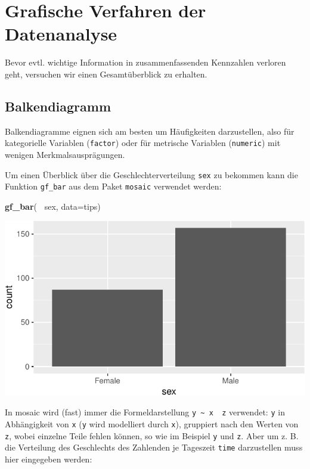 \documentclass[12pt,ngerman,paper=a4,pagesize,DIV=13]{scrreprt}
\newenvironment{Shaded}{\begin{snugshade}}{\end{snugshade}}
\newcommand{\DataTypeTok}[1]{\textcolor[rgb]{0.13,0.29,0.53}{#1}}
\newcommand{\KeywordTok}[1]{\textcolor[rgb]{0.13,0.29,0.53}{\textbf{#1}}}
\newcommand{\NormalTok}[1]{#1}
\newcommand{\OperatorTok}[1]{\textcolor[rgb]{0.81,0.36,0.00}{\textbf{#1}}}
\newcommand{\StringTok}[1]{\textcolor[rgb]{0.31,0.60,0.02}{#1}}
\begin{document}
\hypertarget{grafische-verfahren-der-datenanalyse}{%
\section{Grafische Verfahren der
Datenanalyse}\label{grafische-verfahren-der-datenanalyse}}

Bevor evtl. wichtige Information in zusammenfassenden Kennzahlen
verloren geht, versuchen wir einen Gesamtüberblick zu erhalten.

\hypertarget{balkendiagramm}{%
\subsection{Balkendiagramm}\label{balkendiagramm}}

Balkendiagramme eignen sich am besten um Häufigkeiten darzustellen, also
für kategorielle Variablen (\texttt{factor}) oder für metrische
Variablen (\texttt{numeric}) mit wenigen Merkmalsausprägungen.

Um einen Überblick über die Geschlechterverteilung \texttt{sex} zu
bekommen kann die Funktion \texttt{gf\_bar} aus dem Paket
\texttt{mosaic} verwendet werden:

\begin{Shaded}
\begin{Highlighting}[]
\KeywordTok{gf_bar}\NormalTok{(}\OperatorTok{~}\StringTok{ }\NormalTok{sex, }\DataTypeTok{data=}\NormalTok{tips)}
\end{Highlighting}
\end{Shaded}

\includegraphics{DatenerhebungStatistik-Uebung_files/figure-latex/unnamed-chunk-42-1.pdf}

In mosaic wird (fast) immer die Formeldarstellung
\texttt{y\ \textasciitilde{}\ x\ \textbar{}\ z} verwendet: \texttt{y} in
Abhängigkeit von \texttt{x} (\texttt{y} wird modelliert durch
\texttt{x}), gruppiert nach den Werten von \texttt{z}, wobei einzelne
Teile fehlen können, so wie im Beispiel \texttt{y} und \texttt{z}. Aber
um z. B. die Verteilung des Geschlechts des Zahlenden je Tageszeit
\texttt{time} darzustellen muss hier eingegeben werden:
\end{document}
